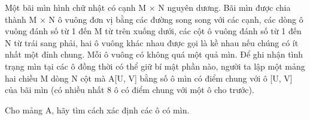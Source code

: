 Một bãi mìn hình chữ nhật có cạnh M × N nguyên dương. Bãi mìn được chia thành M × N ô vuông đơn vị bằng các đường song song với các cạnh,   các dòng ô vuông đánh số từ 1 đến M từ trên xuống dưới, các cột ô vuông đánh số từ 1 đến N từ trái sang phải, hai ô vuông khác nhau được gọi là kề   nhau nếu chúng có ít nhất một đỉnh chung. Mỗi ô vuông có không quá một quả mìn. Để ghi nhận tình trạng mìn tại các ô đồng thời có thể giữ bí mật phần   nào, người ta lập một mảng hai chiều M dòng N cột mà A[U, V] bằng số ô mìn có điểm chung với ô [U, V] của bãi mìn (có nhiều nhất 8 ô có điểm   chung với một ô cho trước).  

   Cho mảng A, hãy tìm cách xác định các ô có mìn.